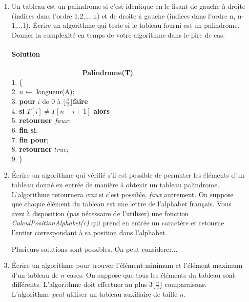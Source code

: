 \documentclass[10pt,a4paper]{article}
\begin{document}
\begin{enumerate}
	
	\item  Un tableau est un palindrome si c'est identique en le lisant de gauche à droite (indices dans l’ordre 1,2,... n) et de droite à gauche (indices dans l'ordre n, n-1,...1). Écrire un algorithme qui teste si le tableau fourni est un palindrome. Donner la complexité en temps de votre algorithme dans le pire de cas.\\
	
	

\begin{tcolorbox}
\paragraph{Solution}
\begin{tabbing}
	~~~~\=~~~~\=~~~~\=~~~~\=~~~~\=\kill
	\>  \textbf{Palindrome(T)}\\
	 1.\> \{\\
	 2.\> \> $n \leftarrow$ longueur(A);\\
	 3.\> \> \textbf{pour} $i$ de $0$ à $\lfloor \frac{n}{2}\rfloor$\textbf{faire}\\
	4.\> \>\> \textbf{si} $T[i]\neq T[n-i+1]$ \textbf{alors}\\
       5.\> \> \> \textbf{retourner}  $faux$;\\
6.\> \> \> \textbf{fin si};\\
7. \> \> \textbf{fin pour};\\	
8.\> \> \textbf{retourner}  $true$;\\
	9.\>  \}
\end{tabbing}
\end{tcolorbox}


\item Écrire un algorithme qui vérifié s'il est possible de permuter les éléments d'un tableau donné en entrée de manière à obtenir un tableau palindrome. L'algorithme retournera \emph{vrai} si c'est possible, \emph{faux} autrement. On suppose que chaque élément du tableau est une lettre de l'alphabet français.
Vous avez à disposition (pas nécessaire de l'utiliser) une fonction \emph{CalculPositionAlphabet(c)} qui prend en entrée un caractère et retourne l'entier correspondant à sa position dans l'alphabet.



\begin{tcolorbox} Plusieurs solutions sont possibles. On peut considerer...
\end{tcolorbox} 


\item Écrire un algorithme pour trouver l'élément minimum et l’élément maximum d’un tableau de $n$ cases. On suppose que tous les éléments du tableau sont différents. L'algorithme doit effectuer au plus $3 \lfloor \frac{n}{2} \rfloor$ comparaisons. L'algorithme \emph{peut} utiliser un tableau auxiliaire de taille $n$.\\




\end{enumerate}
\end{document}
